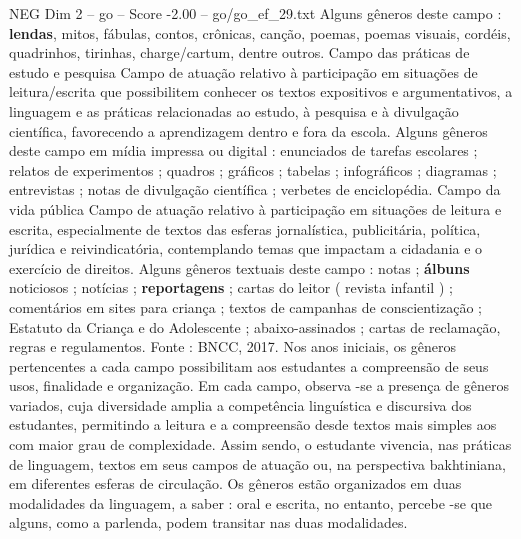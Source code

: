 \begin{textsample}{NEG Dim 2 – go – Score -2.00 – go/go\_ef\_29.txt}
Alguns gêneros deste campo : \textbf{lendas}, mitos, fábulas, contos, crônicas, canção, poemas, poemas visuais, cordéis, quadrinhos, tirinhas, charge/cartum, dentre outros.
Campo das práticas de estudo e pesquisa Campo de atuação relativo à participação em situações de leitura/escrita que possibilitem conhecer os textos expositivos e argumentativos, a linguagem e as práticas relacionadas ao estudo, à pesquisa e à divulgação científica, favorecendo a aprendizagem dentro e fora da escola.
Alguns gêneros deste campo em mídia impressa ou digital : enunciados de tarefas escolares ; relatos de experimentos ; quadros ; gráficos ; tabelas ; infográficos ; diagramas ; entrevistas ; notas de divulgação científica ; verbetes de enciclopédia.
Campo da vida pública Campo de atuação relativo à participação em situações de leitura e escrita, especialmente de textos das esferas jornalística, publicitária, política, jurídica e reivindicatória, contemplando temas que impactam a cidadania e o exercício de direitos.
Alguns gêneros textuais deste campo : notas ; \textbf{álbuns} noticiosos ; notícias ; \textbf{reportagens} ; cartas do leitor ( revista infantil ) ; comentários em sites para criança ; textos de campanhas de conscientização ; Estatuto da Criança e do Adolescente ; abaixo-assinados ; cartas de reclamação, regras e regulamentos.
Fonte : BNCC, 2017.
Nos anos iniciais, os gêneros pertencentes a cada campo possibilitam aos estudantes a compreensão de seus usos, finalidade e organização.
Em cada campo, observa -se a presença de gêneros variados, cuja diversidade amplia a competência linguística e discursiva dos estudantes, permitindo a leitura e a compreensão desde textos mais simples aos com maior grau de complexidade.
Assim sendo, o estudante vivencia, nas práticas de linguagem, textos em seus campos de atuação ou, na perspectiva bakhtiniana, em diferentes esferas de circulação.
Os gêneros estão organizados em duas modalidades da linguagem, a saber : oral e escrita, no entanto, percebe -se que alguns, como a parlenda, podem transitar nas duas modalidades.

\end{textsample}
